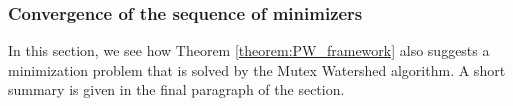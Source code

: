 

\subsubsection{Convergence of the sequence of minimizers}
In this section, we see how Theorem \ref{theorem:PW_framework} also suggests a minimization problem that is solved by the Mutex Watershed algorithm. A short summary is given in the final paragraph of the section.

